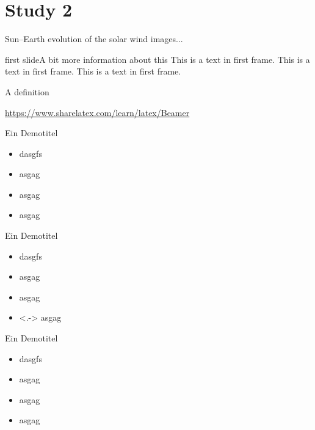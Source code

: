 \documentclass[11pt,aspectratio=1610]{beamer}	%
\newcommand{\captionoftiny}[2]{\captionof{#1}{\color{gray} \tiny #2}}
\begin{document}

\section{Study 2}

\begin{frame}[c]{Sun--Earth evolution of the solar wind}{}
	images...
\end{frame}

\begin{frame}[c]{first slide}{A bit more information about this}
	This is a text in first frame. \pause This is a text in first frame. This is a text in first frame.
	\begin{definition}
		A definition
	\end{definition}
	\url{https://www.sharelatex.com/learn/latex/Beamer}
\end{frame}

\begin{frame}[<+->]{Ein Demotitel}{}
	\begin{itemize}
		\item<1-> dasgfs
		\item<2> asgag
		\item<3-> asgag
		\item asgag
	\end{itemize}
\end{frame}

\begin{frame}[<+->]{Ein Demotitel}{}
	\begin{itemize}
		\item dasgfs
		\item asgag
		\item asgag
		\item<.-> asgag
	\end{itemize}
\end{frame}

\begin{frame}{Ein Demotitel}{}
	\begin{itemize}
		\item<+-> dasgfs
		\item<+-> asgag
		\item<+-> asgag
		\item<+-> asgag
	\end{itemize}
\end{frame}
\end{document}
